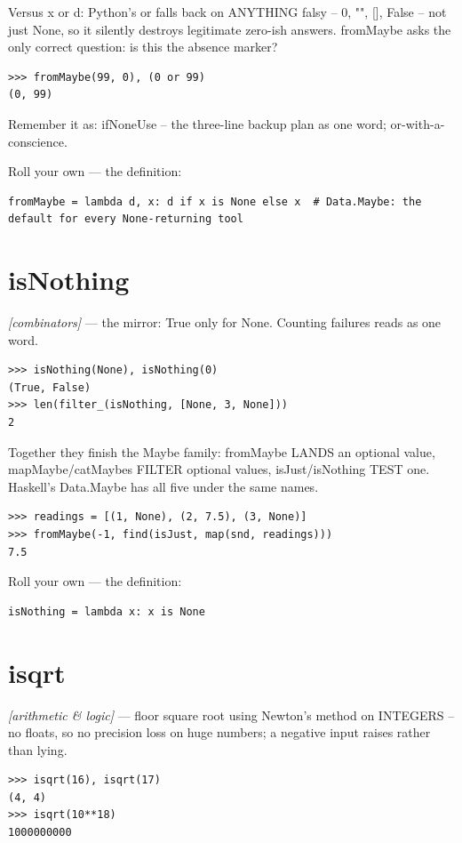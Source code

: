 \documentclass[11pt,letterpaper]{book}
\begin{document}
Versus x or d: Python's or falls back on ANYTHING falsy -- 0, "", [], False -- not just None, so it silently destroys legitimate zero-ish answers. fromMaybe asks the only correct question: is this the absence marker?

\begin{lstlisting}[style=spec]
>>> fromMaybe(99, 0), (0 or 99)
(0, 99)
\end{lstlisting}

Remember it as: ifNoneUse -- the three-line backup plan as one word; or-with-a-conscience.


Roll your own --- the definition:

\begin{lstlisting}[style=code]
fromMaybe = lambda d, x: d if x is None else x  # Data.Maybe: the default for every None-returning tool
\end{lstlisting}

\section{isNothing}
\noindent\textit{[combinators]} --- the mirror: True only for None. Counting failures reads as one word.
\begin{lstlisting}[style=spec]
>>> isNothing(None), isNothing(0)
(True, False)
>>> len(filter_(isNothing, [None, 3, None]))
2
\end{lstlisting}

Together they finish the Maybe family: fromMaybe LANDS an optional value, mapMaybe/catMaybes FILTER optional values, isJust/isNothing TEST one. Haskell's Data.Maybe has all five under the same names.

\begin{lstlisting}[style=spec]
>>> readings = [(1, None), (2, 7.5), (3, None)]
>>> fromMaybe(-1, find(isJust, map(snd, readings)))
7.5
\end{lstlisting}

Roll your own --- the definition:

\begin{lstlisting}[style=code]
isNothing = lambda x: x is None
\end{lstlisting}

\section{isqrt}
\noindent\textit{[arithmetic \& logic]} --- floor square root using Newton's method on INTEGERS -- no floats, so no precision loss on huge numbers; a negative input raises rather than lying.
\begin{lstlisting}[style=spec]
>>> isqrt(16), isqrt(17)
(4, 4)
>>> isqrt(10**18)
1000000000
\end{lstlisting}
\end{document}
